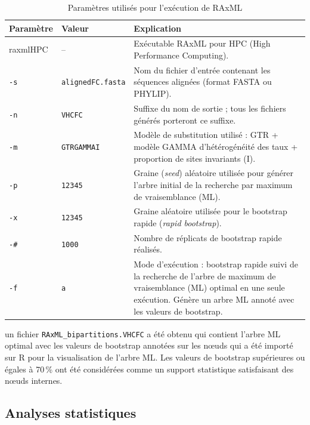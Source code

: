 \documentclass[a4paper,12pt]{article}
\begin{document}
\begin{table}[!htbp]
\centering
\caption{Paramètres utilisés pour l'exécution de RAxML}
\label{tab:raxml_parametres}
\begin{tabular}{p{3cm} p{3cm} p{8cm}}
\toprule
\textbf{Paramètre} & \textbf{Valeur} & \textbf{Explication} \\
\midrule
raxmlHPC & -- & Exécutable RAxML pour HPC (High Performance Computing). \\

\texttt{-s} & \texttt{alignedFC.fasta} &
Nom du fichier d'entrée contenant les séquences alignées (format FASTA ou PHYLIP). \\

\texttt{-n} & \texttt{VHCFC} &
Suffixe du nom de sortie ; tous les fichiers générés porteront ce suffixe. \\

\texttt{-m} & \texttt{GTRGAMMAI} &
Modèle de substitution utilisé : GTR + modèle GAMMA d'hétérogénéité des taux + proportion de sites invariants (I). \\

\texttt{-p} & \texttt{12345} &
Graine (\textit{seed}) aléatoire utilisée pour générer l'arbre initial de la recherche par maximum de vraisemblance (ML). \\

\texttt{-x} & \texttt{12345} &
Graine aléatoire utilisée pour le bootstrap rapide (\textit{rapid bootstrap}). \\

\texttt{-\#} & \texttt{1000} &
Nombre de réplicats de bootstrap rapide réalisés. \\

\texttt{-f} & \texttt{a} &
Mode d'exécution : bootstrap rapide suivi de la recherche de l'arbre de maximum de vraisemblance (ML) optimal en une seule exécution. Génère un arbre ML annoté avec les valeurs de bootstrap. \\
\bottomrule
\end{tabular}
\end{table}

un fichier \texttt{RAxML\_bipartitions.VHCFC} a été obtenu qui contient l’arbre ML optimal avec les valeurs de bootstrap annotées sur les nœuds qui a été importé sur R pour la visualisation de l’arbre ML.
Les valeurs de bootstrap supérieures ou égales à 70\,\% ont été considérées comme un support statistique satisfaisant des nœuds internes.

\subsection {Analyses statistiques}
\end{document}

